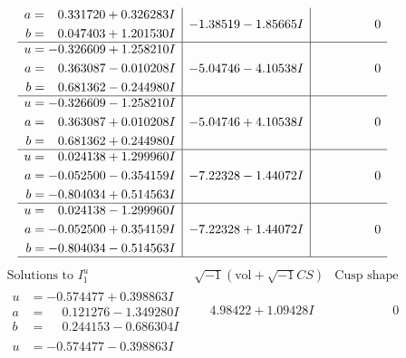\documentclass[1p]{elsarticle_modified}
\theoremstyle{definition}
\newcommand{\I}{\sqrt{-1}}
\begin{document}
$$\begin{array}{c|c|c}
\begin{aligned}
a &= \phantom{-}0.331720 + 0.326283 I \\
b &= \phantom{-}0.047403 + 1.201530 I\end{aligned}
 & -1.38519 - 1.85665 I & \phantom{-0.000000 } 0 \\ \hline\begin{aligned}
u &= -0.326609 + 1.258210 I \\
a &= \phantom{-}0.363087 - 0.010208 I \\
b &= \phantom{-}0.681362 - 0.244980 I\end{aligned}
 & -5.04746 - 4.10538 I & \phantom{-0.000000 } 0 \\ \hline\begin{aligned}
u &= -0.326609 - 1.258210 I \\
a &= \phantom{-}0.363087 + 0.010208 I \\
b &= \phantom{-}0.681362 + 0.244980 I\end{aligned}
 & -5.04746 + 4.10538 I & \phantom{-0.000000 } 0 \\ \hline\begin{aligned}
u &= \phantom{-}0.024138 + 1.299960 I \\
a &= -0.052500 - 0.354159 I \\
b &= -0.804034 + 0.514563 I\end{aligned}
 & -7.22328 - 1.44072 I & \phantom{-0.000000 } 0 \\ \hline\begin{aligned}
u &= \phantom{-}0.024138 - 1.299960 I \\
a &= -0.052500 + 0.354159 I \\
b &= -0.804034 - 0.514563 I\end{aligned}
 & -7.22328 + 1.44072 I & \phantom{-0.000000 } 0\\
 \hline 
 \end{array}$$\newpage$$\begin{array}{c|c|c}  
\text{Solutions to }I^u_{1}& \I (\text{vol} + \sqrt{-1}CS) & \text{Cusp shape}\\
 \hline 
\begin{aligned}
u &= -0.574477 + 0.398863 I \\
a &= \phantom{-}0.121276 - 1.349280 I \\
b &= \phantom{-}0.244153 - 0.686304 I\end{aligned}
 & \phantom{-}4.98422 + 1.09428 I & \phantom{-0.000000 } 0 \\ \hline\begin{aligned}
u &= -0.574477 - 0.398863 I \\

\end{aligned}
\end{array}$$
\end{document}
